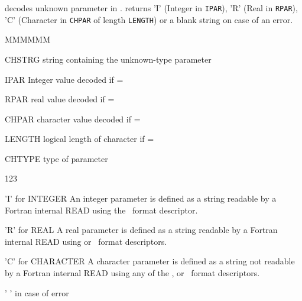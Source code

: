 

\Action decodes unknown parameter in .
 returns 'I' (Integer in {\tt IPAR}), 'R' (Real in {\tt RPAR}),
'C' (Character in {\tt CHPAR} of length {\tt LENGTH}) 
or a blank string on case of an error.
\Pdesc\begin{DLtt}{MMMMMM}
\item[CHSTRG] string containing the unknown-type parameter
\item[IPAR] Integer value decoded if =
\item[RPAR] real value decoded if =
\item[CHPAR] character value decoded if =
\item[LENGTH] logical length of character  if =
\item[CHTYPE] type of parameter  
\begin{DLtt}{123}
\item['I'] for INTEGER
An integer parameter is defined as a string readable by a Fortran
internal READ using the ~format descriptor.
\item['R'] for REAL   
A real parameter is defined as a string readable by a Fortran
internal READ using  or ~format descriptors.
\item['C'] for CHARACTER
A character parameter is defined as a string not readable by a Fortran
internal READ using any of the ,  or ~format
descriptors. 
\item[' '] in case of error
\end{DLtt}
\end{DLtt}

